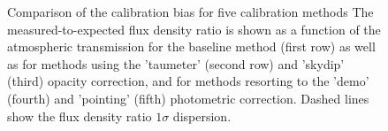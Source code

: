 \begin{figure}[!thbp]
\begin{center}
    \vspace{-0.3cm}
    \caption[Calibration bias comparison]{\small{Comparison of the
        calibration bias for five calibration methods 
       The measured-to-expected flux density ratio is shown as a
      function of the atmospheric transmission for the baseline method
      (first row) as well as for methods using the 'taumeter' (second
      row) and 'skydip' (third) opacity correction, and for methods
      resorting to the 'demo' (fourth) and 'pointing' (fifth)
      photometric correction. Dashed lines
      show the flux density ratio $1 \sigma $ dispersion.}}
    \label{fig:mwc349_obstau_others}
  \end{center}
\end{figure}



